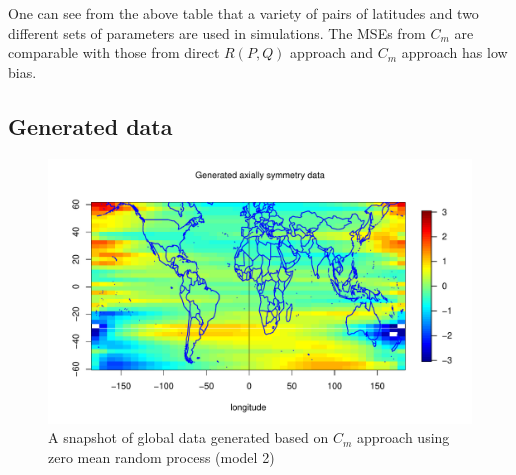 One can see from the above table that a variety of pairs of latitudes and two different sets of parameters are used in simulations. The MSEs from $C_m$ are comparable with those from direct $R(P,Q)$ approach and $C_m$ approach has low bias.



%

%
%
%



\subsection{\bf Generated data}

\begin{figure}[H]
	\centering
		\includegraphics [width=1\textwidth ]{graphs/Data_sample_120_model2_withmap.pdf}
		\caption[A snapshot of global data generated based on $C_m$ approach using zero]{A snapshot of global data generated based on $C_m$ approach using zero mean random process (model 2)}
		\label{grid_plot_model_2}
\end{figure}

